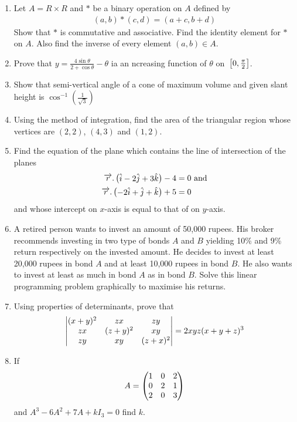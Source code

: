 \documentclass[journal,12pt,twocolumn]{IEEEtran}
\renewcommand\thesection{\arabic{section}}
\begin{document}
\begin{enumerate}[label=\thesection.\arabic*.,ref=\thesection.\theenumi]
\item Let $A = R \times R$ and $*$ be a binary operation on $A$ defined by
	\begin{align}
		(a, b) * (c, d) = (a + c, b + d)
	\end{align}
Show that $*$ is commutative and associative. Find the identity element for $*$
on $A$. Also find the inverse of every element $(a, b) \in A$.

\item Prove that $ y = \frac{4\sin \theta}{2+ \cos \theta} - \theta$ ia an ncreasing function of $\theta$ on ${}\left[0,\frac{\pi}{2}\right]$.

\item Show that semi-vertical angle of a cone of maximum volume and given slant height is
$\cos^{-1}\left( \frac{1}{\sqrt{3}} \right)$

\item Using the method of integration, find the area of the triangular region whose vertices are $(2, 2)$, $(4, 3)$ and $(1, 2)$.

\item Find the equation of the plane which contains the line of intersection of the planes
	\begin{align}
		\overrightarrow{r}.\begin{pmatrix}\hat{i} - 2\hat{j} + 3\hat{k}\end{pmatrix} - 4 &= 0 \text{  and}\\
		\overrightarrow{r}.\begin{pmatrix}-2\hat{i} + \hat{j} + \hat{k}\end{pmatrix} + 5 &= 0
	\end{align}
and whose intercept on $x$-axis is equal to that of on $y$-axis.

\item  A retired person wants to invest an amount of 50,000 rupees. His broker recommends investing in two type of bonds $A$ and $B$ yielding 10\% and 9\% return respectively on the invested amount. He decides to invest at least
20,000 rupees in bond $A$ and at least 10,000 rupees in bond $B$. He also wants to invest at least as much in bond $A$ as in bond $B$. Solve this linear programming problem graphically to maximise his returns.

\item Using properties of determinants, prove that
	\begin{align}
		\begin{vmatrix}(x + y)^2 & zx & zy \\
		zx & (z+y)^2 & xy \\
		zy & xy & (z+x)^2\end{vmatrix}
		 = 2xyz (x + y + z)^3
	\end{align}
	
\item If 
	\begin{align}
		A = \begin{pmatrix}1 & 0 & 2\\
		0 & 2 & 1 \\
		2 & 0 & 3\end{pmatrix}
	\end{align}
and $A^3-6A^2+7A+kI_3=0$ find $k$.

\end{enumerate}
\end{document}

